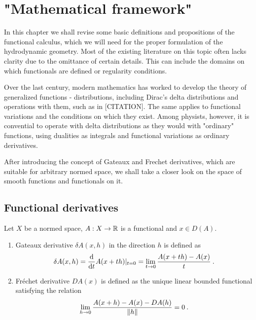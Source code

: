 \chapter{"Mathematical framework"}

In this chapter we shall revise some basic definitions and propositions of the functional calculus, which we will need for the proper formulation of the hydrodynamic geometry. Most of the existing literature on this topic often lacks clarity due to the omittance of certain details. This can include the domains on which functionals are defined or regularity conditions.

Over the last century, modern mathematics has worked to develop the theory of generalized functions - distributions, including Dirac's delta distributions and operations with them, such as in [CITATION]. The same applies to functional variations and the conditions on which they exist. 
Among physists, however, it is convential to operate with delta distributions as they would with "ordinary" functions, using dualities as integrals and functional variations as ordinary derivatives.


After introducing the concept of Gateaux and Frechet derivatives, which are suitable for arbitrary normed space, we shall take a closer look on the space of smooth functions and functionals on it.

\section{Functional derivatives}


\begin{definition}
    Let $X$ be a normed space, $A: X \to \mathbb{R}$ is a functional and $x \in D(A)$.
    \begin{enumerate}
        \item Gateaux derivative $\delta A(x,h)$ in the direction $h$ is defined as
        \begin{align}
            \delta A (x,h) = \frac{\mathrm{d}}{\mathrm{d}t} A(x+th) |_{t=0} = \lim_{t \rightarrow 0} \frac{A(x+th)-A(x)}{t} \:.
        \end{align}

        \item Fréchet derivative $DA(x)$ is defined as the unique linear bounded functional satisfying the relation
        \begin{align}
            \lim_{h \rightarrow 0} \frac{A(x+h)-A(x)- DA(h)}{\left \Vert h \right \Vert} = 0 \:.
        \end{align}
    \end{enumerate}
\end{definition}

